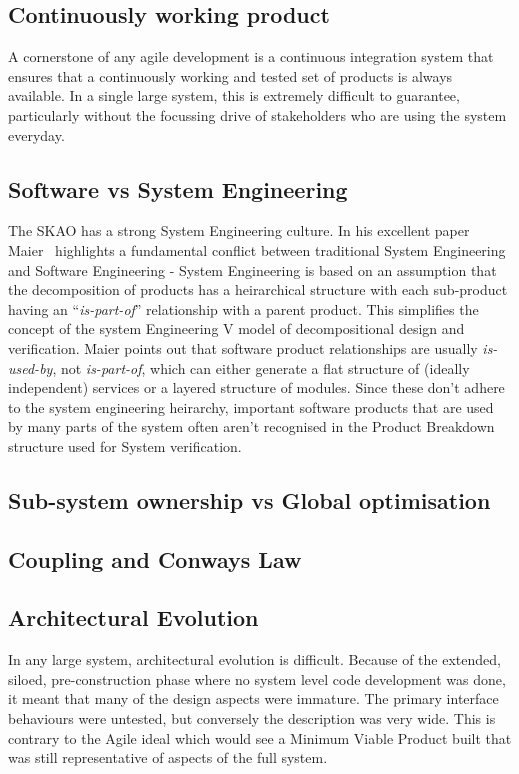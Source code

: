 \documentclass[a4paper,
               biblatex,     %
               keeplastbox,   %
               ]{jacow}
\begin{document}
\subsection{Continuously working product}
A cornerstone of any agile development is a continuous integration system that ensures that a continuously  working and tested set of products is always available. In a single large system, this is extremely difficult to guarantee, particularly without the focussing drive of stakeholders who are using the system everyday.

\subsection{Software vs System Engineering}
The SKAO has a strong System Engineering culture. In his excellent paper Maier~\cite{Maier2006} highlights a fundamental conflict between traditional System Engineering and Software Engineering - System Engineering is based on an assumption that the decomposition of products has a heirarchical structure with each sub-product having an ``{\em is-part-of}'' relationship with a parent product. This simplifies the concept of the system Engineering V model of decompositional design and verification. Maier points out that software product relationships are usually {\em is-used-by}, not {\em is-part-of}, which can either generate a flat structure of (ideally independent) services or a layered structure of modules. Since these don't adhere to the system engineering heirarchy, important software products that are used by many parts of the system often aren't recognised in the Product Breakdown structure used for System verification.

\subsection{Sub-system ownership vs Global optimisation}
\subsection{Coupling and Conways Law}
\subsection{Architectural Evolution}
In any large system, architectural evolution is difficult. Because of the extended, siloed, pre-construction phase where no system level code development was done, it meant that many of the design aspects were immature. The primary interface behaviours were untested, but conversely the description was very wide. This is contrary to the Agile ideal which would see a Minimum Viable Product built that was still representative of aspects of the full system. 
\end{document}
